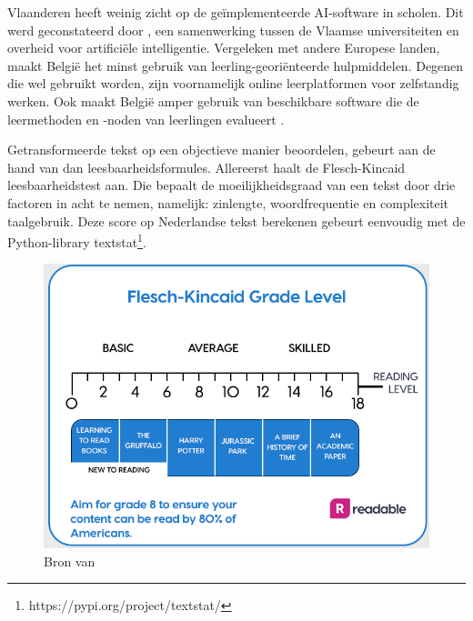 Vlaanderen heeft weinig zicht op de geïmplementeerde AI-software in scholen. Dit werd geconstateerd door \autocite{Martens2021}, een samenwerking tussen de Vlaamse universiteiten en overheid voor artificiële intelligentie. Vergeleken met andere Europese landen, maakt België het minst gebruik van leerling-georiënteerde hulpmiddelen. Degenen die wel gebruikt worden, zijn voornamelijk online leerplatformen voor zelfstandig werken. Ook maakt België amper gebruik van beschikbare software die de leermethoden en -noden van leerlingen evalueert \autocite{Martens2021a}. 


Getransformeerde tekst op een objectieve manier beoordelen, gebeurt aan de hand van dan leesbaarheidsformules. Allereerst haalt \textcite{Readable2021} de Flesch-Kincaid leesbaarheidstest aan. Die bepaalt de moeilijkheidsgraad van een tekst door drie factoren in acht te nemen, namelijk: zinlengte, woordfrequentie en complexiteit taalgebruik. Deze score op Nederlandse tekst berekenen gebeurt eenvoudig met de Python-library textstat\footnote{https://pypi.org/project/textstat/}. 

\begin{figure}
	\includegraphics[width=\linewidth]{img/Screenshot_302.png}
	\caption{Bron van \textcite{Readable2021}}
\end{figure}

